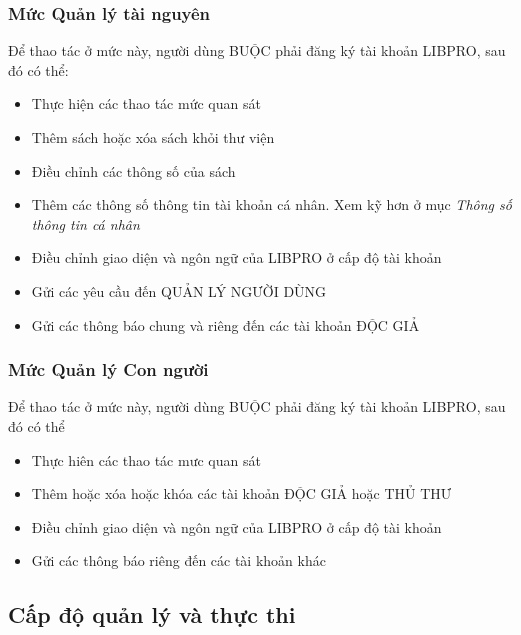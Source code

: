 \documentclass[12pt,a4paper]{report}
\begin{document}
			\subsubsection{Mức Quản lý tài nguyên}
			Để thao tác ở mức này, người dùng BUỘC phải đăng ký tài khoản LIBPRO, sau đó có thể:
			\begin{itemize}
				\item Thực hiện các thao tác mức quan sát
				\item Thêm sách hoặc xóa sách khỏi thư viện
				\item Điều chỉnh các thông số của sách
				\item Thêm các thông số thông tin tài khoản cá nhân. Xem kỹ hơn ở mục \textit{Thông số thông tin cá nhân}
				\item Điều chỉnh giao diện và ngôn ngữ của LIBPRO ở cấp độ tài khoản
				\item Gửi các yêu cầu đến QUẢN LÝ NGƯỜI DÙNG
				\item Gửi các thông báo chung và riêng đến các tài khoản ĐỘC GIẢ
			\end{itemize}

			\subsubsection{Mức Quản lý Con người}
			Để thao tác ở mức này, người dùng BUỘC phải đăng ký tài khoản LIBPRO, sau đó có thể
			\begin{itemize}
				\item Thực hiên các thao tác mưc quan sát
				\item Thêm hoặc xóa hoặc khóa các tài khoản ĐỘC GIẢ hoặc THỦ THƯ
				\item Điều chỉnh giao diện và ngôn ngữ của LIBPRO ở cấp độ tài khoản
				\item Gửi các thông báo riêng đến các tài khoản khác
			\end{itemize}
		\subsection{Cấp độ quản lý và thực thi}
\end{document}
